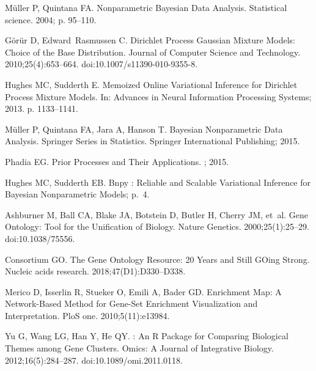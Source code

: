\documentclass[10pt,letterpaper]{article}
\begin{document}
\begin{thebibliography}{10}
	M{\"u}ller P, Quintana FA.
	\newblock Nonparametric Bayesian Data Analysis.
	\newblock Statistical science. 2004; p. 95--110.
	
	G{\"o}r{\"u}r D, Edward~Rasmussen C.
	\newblock Dirichlet {{Process Gaussian Mixture Models}}: {{Choice}} of the
	{{Base Distribution}}.
	\newblock Journal of Computer Science and Technology. 2010;25(4):653--664.
	\newblock doi:{10.1007/s11390-010-9355-8}.
	
	Hughes MC, Sudderth E.
	\newblock Memoized Online Variational Inference for {{Dirichlet}} Process
	Mixture Models.
	\newblock In: Advances in Neural Information Processing Systems; 2013. p.
	1133--1141.
	
	M{\"u}ller P, Quintana FA, Jara A, Hanson T.
	\newblock Bayesian {{Nonparametric Data Analysis}}.
	\newblock Springer {{Series}} in {{Statistics}}. {Springer International
		Publishing}; 2015.
	
	Phadia EG.
	\newblock Prior Processes and Their Applications.
	; 2015.
	
	Hughes MC, Sudderth EB.
	\newblock Bnpy : {{Reliable}} and Scalable Variational Inference for
	{{Bayesian}} Nonparametric Models; p.~4.
	
	Ashburner M, Ball CA, Blake JA, Botstein D, Butler H, Cherry JM, et~al.
	\newblock Gene {{Ontology}}: Tool for the Unification of Biology.
	\newblock Nature Genetics. 2000;25(1):25--29.
	\newblock doi:{10.1038/75556}.
	
	Consortium GO.
	\newblock The Gene Ontology Resource: 20 Years and Still {{GOing}} Strong.
	\newblock Nucleic acids research. 2018;47(D1):D330--D338.
	
	Merico D, Isserlin R, Stueker O, Emili A, Bader GD.
	\newblock Enrichment Map: A Network-Based Method for Gene-Set Enrichment
	Visualization and Interpretation.
	\newblock PloS one. 2010;5(11):e13984.
	
	Yu G, Wang LG, Han Y, He QY.
	: An {{R}} Package for Comparing Biological Themes
	among Gene Clusters.
	\newblock Omics: A Journal of Integrative Biology. 2012;16(5):284--287.
	\newblock doi:{10.1089/omi.2011.0118}.
	

\end{thebibliography}
\end{document}
